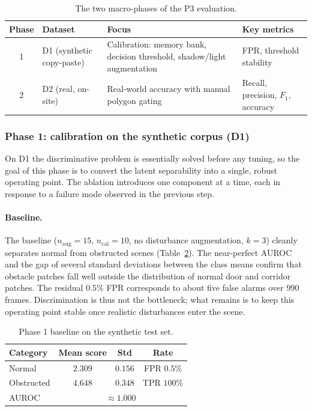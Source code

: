 \begin{table}[h]
  \centering
  \begin{tabular}{c l p{4.3cm} p{3.2cm}}
    \hline
    Phase & Dataset & Focus & Key metrics \\
    \hline
    1 & D1 (synthetic copy-paste) & Calibration: memory bank, decision threshold, shadow/light augmentation & FPR, threshold stability \\
    2 & D2 (real, on-site) & Real-world accuracy with manual polygon gating & Recall, precision, $F_1$, accuracy \\
    \hline
  \end{tabular}
  \caption{The two macro-phases of the P3 evaluation.}
  \label{tab:p3-phases}
\end{table}

\subsubsection{Phase 1: calibration on the synthetic corpus (D1)}

On D1 the discriminative problem is essentially solved before any tuning, so the
goal of this phase is to convert the latent separability into a single, robust
operating point. The ablation introduces one component at a time, each in
response to a failure mode observed in the previous step.

\paragraph{Baseline.}
The baseline ($n_{\mathrm{aug}}=15$, $n_{\mathrm{cal}}=10$, no disturbance
augmentation, $k=3$) cleanly separates normal from obstructed scenes
(Table~\ref{tab:p3-phaseA}). The near-perfect AUROC and the gap of several
standard deviations between the class means confirm that obstacle patches fall
well outside the distribution of normal door and corridor patches. The residual
$0.5\%$ FPR corresponds to about five false alarms over $990$ frames.
Discrimination is thus not the bottleneck; what remains is to keep this operating
point stable once realistic disturbances enter the scene.

\begin{table}[h]
  \centering
  \begin{tabular}{lccc}
    \hline
    Category & Mean score & Std & Rate \\
    \hline
    Normal & $2.309$ & $0.156$ & FPR $0.5\%$ \\
    Obstructed & $4.648$ & $0.348$ & TPR $100\%$ \\
    AUROC & \multicolumn{3}{c}{$\approx 1.000$} \\
    \hline
  \end{tabular}
  \caption{Phase 1 baseline on the synthetic test set.}
  \label{tab:p3-phaseA}
\end{table}

